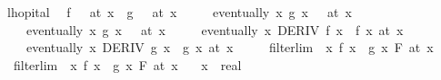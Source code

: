 \begin{isabellebody}
\endisatagproof
{\isafoldproof}%
%
\isadelimproof
\isanewline
%
\endisadelimproof
\isanewline
{}\isamarkupfalse%
\ lhopital{\isacharcolon}{\kern0pt}\isanewline
\ \ {\isachardoublequoteopen}{\isacharparenleft}{\kern0pt}f\ {\isasymlonglongrightarrow}\ {}{\isacharparenright}{\kern0pt}\ {\isacharparenleft}{\kern0pt}at\ x{\isacharparenright}{\kern0pt}\ {\isasymLongrightarrow}\ {\isacharparenleft}{\kern0pt}g\ {\isasymlonglongrightarrow}\ {}{\isacharparenright}{\kern0pt}\ {\isacharparenleft}{\kern0pt}at\ x{\isacharparenright}{\kern0pt}\ {\isasymLongrightarrow}\isanewline
\ \ \ \ eventually\ {\isacharparenleft}{\kern0pt}{\isasymlambda}x{\isachardot}{\kern0pt}\ g\ x\ {\isasymnoteq}\ {}{\isacharparenright}{\kern0pt}\ {\isacharparenleft}{\kern0pt}at\ x{\isacharparenright}{\kern0pt}\ {\isasymLongrightarrow}\isanewline
\ \ \ \ eventually\ {\isacharparenleft}{\kern0pt}{\isasymlambda}x{\isachardot}{\kern0pt}\ g{\isacharprime}{\kern0pt}\ x\ {\isasymnoteq}\ {}{\isacharparenright}{\kern0pt}\ {\isacharparenleft}{\kern0pt}at\ x{\isacharparenright}{\kern0pt}\ {\isasymLongrightarrow}\isanewline
\ \ \ \ eventually\ {\isacharparenleft}{\kern0pt}{\isasymlambda}x{\isachardot}{\kern0pt}\ DERIV\ f\ x\ {\isacharcolon}{\kern0pt}{\isachargreater}{\kern0pt}\ f{\isacharprime}{\kern0pt}\ x{\isacharparenright}{\kern0pt}\ {\isacharparenleft}{\kern0pt}at\ x{\isacharparenright}{\kern0pt}\ {\isasymLongrightarrow}\isanewline
\ \ \ \ eventually\ {\isacharparenleft}{\kern0pt}{\isasymlambda}x{\isachardot}{\kern0pt}\ DERIV\ g\ x\ {\isacharcolon}{\kern0pt}{\isachargreater}{\kern0pt}\ g{\isacharprime}{\kern0pt}\ x{\isacharparenright}{\kern0pt}\ {\isacharparenleft}{\kern0pt}at\ x{\isacharparenright}{\kern0pt}\ {\isasymLongrightarrow}\isanewline
\ \ \ \ filterlim\ {\isacharparenleft}{\kern0pt}{\isasymlambda}\ x{\isachardot}{\kern0pt}\ {\isacharparenleft}{\kern0pt}f{\isacharprime}{\kern0pt}\ x\ {\isacharslash}{\kern0pt}\ g{\isacharprime}{\kern0pt}\ x{\isacharparenright}{\kern0pt}{\isacharparenright}{\kern0pt}\ F\ {\isacharparenleft}{\kern0pt}at\ x{\isacharparenright}{\kern0pt}\ {\isasymLongrightarrow}\isanewline
\ \ filterlim\ {\isacharparenleft}{\kern0pt}{\isasymlambda}\ x{\isachardot}{\kern0pt}\ f\ x\ {\isacharslash}{\kern0pt}\ g\ x{\isacharparenright}{\kern0pt}\ F\ {\isacharparenleft}{\kern0pt}at\ x{\isacharparenright}{\kern0pt}{\isachardoublequoteclose}\isanewline
\ \ \ x\ {\isacharcolon}{\kern0pt}{\isacharcolon}{\kern0pt}\ real\isanewline
%
\isadelimproof
\ \ %
\endisadelimproof
%
\isatagproof
{}\isamarkupfalse%

\end{isabellebody}
